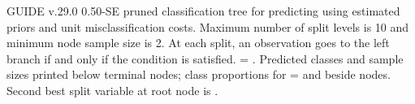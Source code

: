 \documentclass[12pt]{article}
\begin{document}
 \begin{center}
 \end{center}
GUIDE v.29.0  0.50-SE pruned
classification tree for predicting \texttt{} using
estimated priors
and unit misclassification costs.
Maximum number of split levels is 10 and minimum node sample size is 2.
At each split, an observation goes to the left branch 
 if and only if the condition is satisfied.
\texttt{} = \texttt{}.
Predicted classes and sample sizes printed below terminal nodes;
 class proportions for \texttt{} =
 \texttt{} and \texttt{} beside nodes.
Second best split variable at root node is \texttt{}.
 
\end{document}
